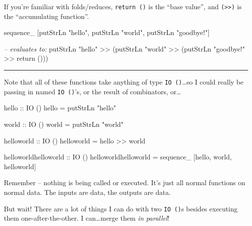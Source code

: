 \documentclass[]{article}
\newenvironment{Shaded}{\begin{snugshade}}{\end{snugshade}}
\newcommand{\CommentTok}[1]{\textcolor[rgb]{0.56,0.35,0.01}{\textit{#1}}}
\newcommand{\DataTypeTok}[1]{\textcolor[rgb]{0.13,0.29,0.53}{#1}}
\newcommand{\FunctionTok}[1]{\textcolor[rgb]{0.00,0.00,0.00}{#1}}
\newcommand{\NormalTok}[1]{#1}
\newcommand{\OtherTok}[1]{\textcolor[rgb]{0.56,0.35,0.01}{#1}}
\newcommand{\StringTok}[1]{\textcolor[rgb]{0.31,0.60,0.02}{#1}}
\begin{document}
If you're familiar with folds/reduces, \texttt{return\ ()} is the ``base
value'', and \texttt{(\textgreater{}\textgreater{})} is the ``accumulating
function''.

\begin{Shaded}
\begin{Highlighting}[]
\NormalTok{sequence_ [putStrLn }\StringTok{"hello"}\NormalTok{, putStrLn }\StringTok{"world"}\NormalTok{, putStrLn }\StringTok{"goodbye!"}\NormalTok{]}

\CommentTok{-- evaluates to:}
\NormalTok{putStrLn }\StringTok{"hello"} \FunctionTok{>>}\NormalTok{ (putStrLn }\StringTok{"world"} \FunctionTok{>>}\NormalTok{ (putStrLn }\StringTok{"goodbye!"} \FunctionTok{>>}\NormalTok{ return ()))}
\end{Highlighting}
\end{Shaded}

\begin{center}\rule{0.5\linewidth}{\linethickness}\end{center}

Note that all of these functions take anything of type \texttt{IO\ ()}\ldots{}so
I could really be passing in named \texttt{IO\ ()}'s, or the result of
combinators, or\ldots{}

\begin{Shaded}
\begin{Highlighting}[]
\OtherTok{hello ::} \DataTypeTok{IO}\NormalTok{ ()}
\NormalTok{hello }\FunctionTok{=}\NormalTok{ putStrLn }\StringTok{"hello"}

\OtherTok{world ::} \DataTypeTok{IO}\NormalTok{ ()}
\NormalTok{world }\FunctionTok{=}\NormalTok{ putStrLn }\StringTok{"world"}

\OtherTok{helloworld ::} \DataTypeTok{IO}\NormalTok{ ()}
\NormalTok{helloworld }\FunctionTok{=}\NormalTok{ hello }\FunctionTok{>>}\NormalTok{ world}

\OtherTok{helloworldhelloworld ::} \DataTypeTok{IO}\NormalTok{ ()}
\NormalTok{helloworldhelloworld }\FunctionTok{=}\NormalTok{ sequence_ [hello, world, helloworld]}
\end{Highlighting}
\end{Shaded}

Remember -- nothing is being called or executed. It's just all normal functions
on normal data. The inputs are data, the outputs are data.

But wait! There are a lot of things I can do with two \texttt{IO\ ()}s besides
executing them one-after-the-other. I can\ldots{}merge them \emph{in parallel}!
\end{document}
